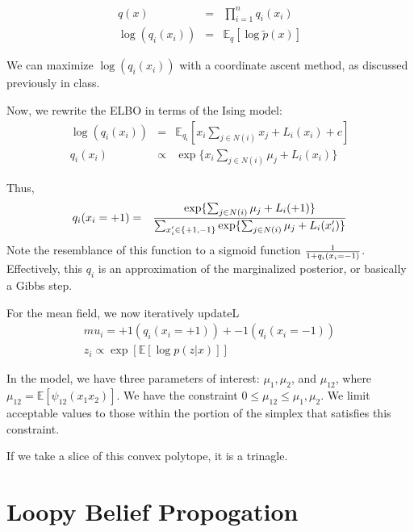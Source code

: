 \documentclass[twoside]{article}
\begin{document}
\begin{eqnarray*}
q(x) &=& \prod_{i=1}^n q_i (x_i) \\
\log ( q_i (x_i)) &=& \mathbb{E}_q [ \log \tilde{p}(x) ]
\end{eqnarray*}

We can maximize $\log ( q_i (x_i))$ with a coordinate ascent method, as discussed previously in class.

Now, we rewrite the ELBO in terms of the Ising model:
\begin{eqnarray*}
\log (q_i (x_i)) &=& \mathbb{E}_{q_i} [ x_i \sum_{j \in N(i)} x_j + L_i(x_i) +c ] \\
q_i (x_i) &\propto& \exp \{ x_i \sum_{j \in N(i)} \mu_j + L_i(x_i) \}
\end{eqnarray*}

Thus, 
\begin{eqnarray*}
q_i(x_i=+1) &=& { \exp\{ \sum_{j \in N(i)} \mu_j + L_i(+1) \}   \over \sum_{x_i^{\prime} \in \{ +1, -1\}} \exp \{ \sum_{j \in N(i)} \mu_j + L_i(x_i^{\prime}) \} }
\end{eqnarray*}
Note the resemblance of this function to a sigmoid function $1 \over 1+q_i(x_i=-1)$. Effectively, this $q_i$ is an approximation of the marginalized posterior, or basically a Gibbs step.

For the mean field, we now iteratively updateL 
\begin{eqnarray*}
mu_i = +1 (q_i(x_i=+1)) + -1 (q_i(x_i=-1)) \\
z_i \propto \exp[ \mathbb{E}[ \log p(z|x)]]
\end{eqnarray*}

In the model, we have three parameters of interest: $\mu_1, \mu_2$, and $\mu_{12}$, where $\mu_{12}=\mathbb{E}[\psi_{12}(x_1 x_2)]$. We have the constraint $0 \leq \mu_{12} \leq \mu_1, \mu_2$. We limit acceptable values to those within the portion of the simplex that satisfies this constraint. 


If we take a slice of this convex polytope, it is a trinagle. %

\section{Loopy Belief Propogation}
\end{document}
